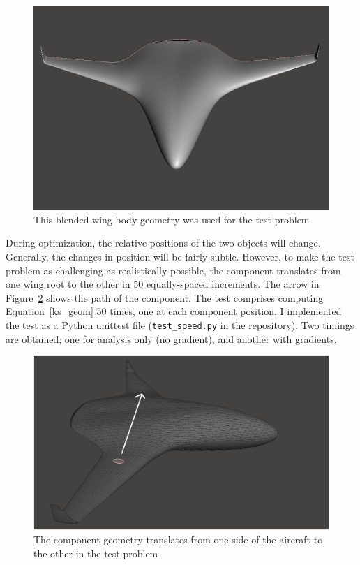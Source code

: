 \documentclass[11pt,letterpaper]{article}
\begin{document}
\begin{figure}[ht]
  \centering
  \includegraphics[width=0.66\linewidth]{figures/bwb_alone.png}
  \caption{This blended wing body geometry was used for the test problem}
  \label{fig:bwb-alone}
\end{figure}

\qquad During optimization, the relative positions of the two objects will change.
Generally, the changes in position will be fairly subtle.
However, to make the test problem as challenging as realistically possible, the component translates from one wing root to the other in 50 equally-spaced increments.
The arrow in Figure~\ref{fig:bwb-blob} shows the path of the component.
The test comprises computing Equation~\ref{ks_geom} 50 times, one at each component position.
I implemented the test as a Python unittest file (\texttt{test\_speed.py} in the repository).
Two timings are obtained; one for analysis only (no gradient), and another with gradients.

\begin{figure}[ht]
  \centering
  \includegraphics[width=0.80\linewidth]{figures/bwb_With_blob_arrow.png}
  \caption{The component geometry translates from one side of the aircraft to the other in the test problem}
  \label{fig:bwb-blob}
\end{figure}
\end{document}
